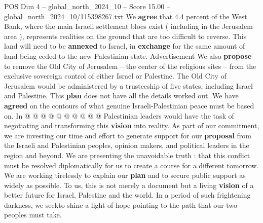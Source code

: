 \begin{textsample}{POS Dim 4 – global\_north\_2024\_10 – Score 15.00 – global\_north\_2024\_10/115398267.txt}
We \textbf{agree} that 4.4 percent of the West Bank, where the main Israeli settlement blocs exist ( including in the Jerusalem area ), represents realities on the ground that are too difficult to reverse.
This land will need to be \textbf{annexed} to Israel, in \textbf{exchange} for the same amount of land being ceded to the new Palestinian state.
Advertisement We also \textbf{propose} to remove the Old City of Jerusalem -- the center of the religious sites -- from the exclusive sovereign control of either Israel or Palestine.
The Old City of Jerusalem would be administered by a trusteeship of five states, including Israel and Palestine.
This \textbf{plan} does not have all the details worked out.
We have \textbf{agreed} on the contours of what genuine Israeli-Palestinian peace must be based on.
In @ @ @ @ @ @ @ @ @ @ Palestinian leaders would have the task of negotiating and transforming this \textbf{vision} into reality.
As part of our commitment, we are investing our time and effort to generate support for our \textbf{proposal} from the Israeli and Palestinian peoples, opinion makers, and political leaders in the region and beyond.
We are presenting the unavoidable truth : that this conflict must be resolved diplomatically for us to create a course for a different tomorrow.
We are working tirelessly to explain our \textbf{plan} and to secure public support as widely as possible.
To us, this is not merely a document but a living \textbf{vision} of a better future for Israel, Palestine and the world.
In a period of such frightening darkness, we seekto shine a light of hope pointing to the path that our two peoples must take.

\end{textsample}
